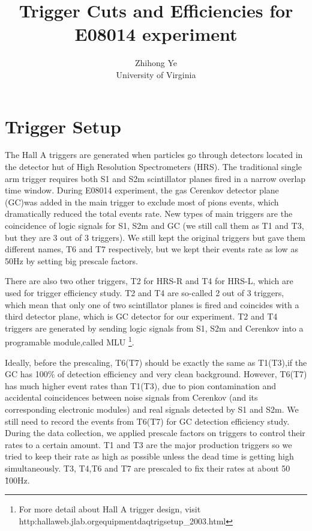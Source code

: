 \documentclass[a4paper,10.5pt]{article}
\title{Trigger Cuts and Efficiencies for E08014 experiment}
\author{Zhihong Ye\\
 University of Virginia
}
\begin{document}
\maketitle

\section{Trigger Setup}

  The Hall A triggers are generated when particles go through detectors located in the detector hut of High Resolution Spectrometers (HRS). The traditional single arm trigger requires both S1 and S2m scintillator planes fired in a narrow overlap time window. During E08014 experiment, the gas Cerenkov detector plane (GC)was added in the main trigger to exclude most of pions events, which dramatically reduced the total events rate. New types of main triggers are the coincidence of logic signals for S1, S2m and GC (we still call them as T1 and T3, but they are 3 out of 3 triggers). We still kept the original triggers but gave them different names, T6 and T7 respectively, but we kept their events rate as low as 50Hz by setting big prescale factors.

 There are also two other triggers, T2 for HRS-R and T4 for HRS-L, which are used for trigger efficiency study. T2 and T4 are so-called 2 out of 3 triggers, which mean that only one of two scintillator planes is fired and coincides with a third detector plane, which is GC detector for our experiment. T2 and T4 triggers are generated by sending logic signals from S1, S2m and Cerenkov into a programable module,called MLU \footnote{For more detail about Hall A trigger design, visit http:\/\/hallaweb.jlab.org\/equipment\/daq\/trigsetup\_2003.html}.

 Ideally, before the prescaling, T6(T7) should be exactly the same as T1(T3),if the GC has 100\% of detection efficiency and very clean background. However, T6(T7) has much higher event rates than T1(T3), due to pion contamination and accidental coincidences between noise signals from Cerenkov (and its corresponding electronic modules) and real signals detected by S1 and S2m. We still need to record the events from T6(T7) for GC detection efficiency study. During the data collection, we applied prescale factors on triggers to control their rates to a certain amount. T1 and T3 are the major production triggers so we tried to keep their rate as high as possible unless the dead time is getting high simultaneously. T3, T4,T6 and T7 are prescaled to fix their rates at about 50 \~ 100Hz.
\end{document}
